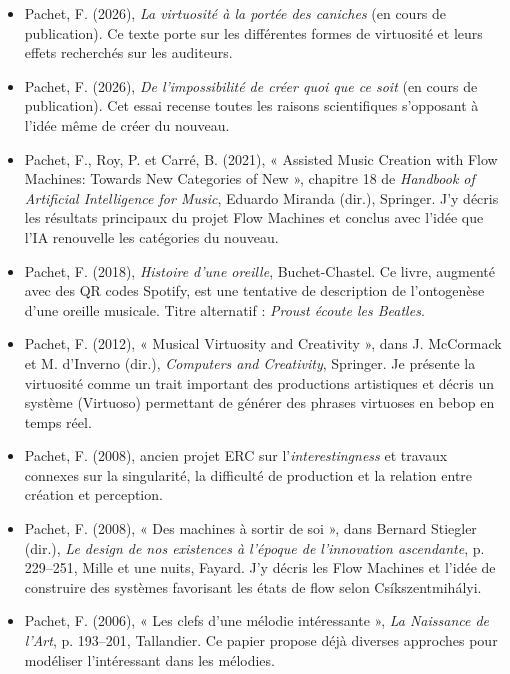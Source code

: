 \documentclass[10pt,a4paper]{article}
\begin{document}
\begin{itemize}
  \item Pachet, F. (2026), \emph{La virtuosité à la portée des caniches}
        (en cours de publication). Ce texte porte sur les différentes formes de
        virtuosité et leurs effets recherchés sur les auditeurs.
  \item Pachet, F. (2026), \emph{De l'impossibilité de créer quoi que ce soit}
        (en cours de publication). Cet essai recense toutes les raisons
        scientifiques s'opposant à l'idée même de créer du nouveau.
  \item Pachet, F., Roy, P. et Carré, B. (2021), « Assisted Music Creation with
        Flow Machines: Towards New Categories of New », chapitre 18 de
        \emph{Handbook of Artificial Intelligence for Music}, Eduardo Miranda
        (dir.), Springer. J'y décris les résultats principaux du projet Flow
        Machines et conclus avec l'idée que l'IA renouvelle les catégories du
        nouveau.
  \item Pachet, F. (2018), \emph{Histoire d'une oreille}, Buchet-Chastel. Ce
        livre, augmenté avec des QR codes Spotify, est une tentative de
        description de l'ontogenèse d'une oreille musicale. Titre alternatif :
        \emph{Proust écoute les Beatles}.
  \item Pachet, F. (2012), « Musical Virtuosity and Creativity », dans
        J. McCormack et M. d'Inverno (dir.), \emph{Computers and Creativity},
        Springer. Je présente la virtuosité comme un trait important des
        productions artistiques et décris un système (Virtuoso) permettant de
        générer des phrases virtuoses en bebop en temps réel.
  \item Pachet, F. (2008), ancien projet ERC sur l'\emph{interestingness} et
        travaux connexes sur la singularité, la difficulté de production et la
        relation entre création et perception.
  \item Pachet, F. (2008), « Des machines à sortir de soi », dans Bernard
        Stiegler (dir.), \emph{Le design de nos existences à l'époque de
        l'innovation ascendante}, p. 229--251, Mille et une nuits, Fayard. J'y
        décris les Flow Machines et l'idée de construire des systèmes favorisant
        les états de flow selon Csíkszentmihályi.
  \item Pachet, F. (2006), « Les clefs d'une mélodie intéressante »,
        \emph{La Naissance de l'Art}, p. 193--201, Tallandier. Ce papier propose
        déjà diverses approches pour modéliser l'intéressant dans les mélodies.
\end{itemize}
\end{document}
